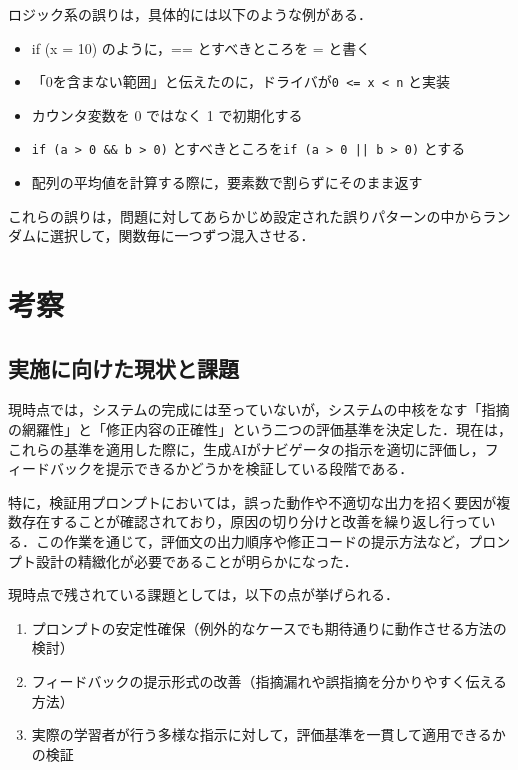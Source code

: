 \documentclass[twoside,twocolumn,10pt]{jsarticle}
\begin{document}
ロジック系の誤りは，具体的には以下のような例がある．

\begin{itemize}
        \item if (x = 10) のように，== とすべきところを = と書く
        \item 「0を含まない範囲」と伝えたのに，ドライバが\texttt{0 <= x < n} と実装
        \item カウンタ変数を 0 ではなく 1 で初期化する
        \item \texttt{if (a > 0 \&\& b > 0)} とすべきところを\texttt{if (a > 0 || b > 0)} とする
        \item 配列の平均値を計算する際に，要素数で割らずにそのまま返す
\end{itemize}

これらの誤りは，問題に対してあらかじめ設定された誤りパターンの中からランダムに選択して，関数毎に一つずつ混入させる．

\section{考察}\label{考察}

\subsection{実施に向けた現状と課題}
現時点では，システムの完成には至っていないが，システムの中核をなす「指摘の網羅性」と「修正内容の正確性」という二つの評価基準を決定した．現在は，これらの基準を適用した際に，生成AIがナビゲータの指示を適切に評価し，フィードバックを提示できるかどうかを検証している段階である．

特に，検証用プロンプトにおいては，誤った動作や不適切な出力を招く要因が複数存在することが確認されており，原因の切り分けと改善を繰り返し行っている．この作業を通じて，評価文の出力順序や修正コードの提示方法など，プロンプト設計の精緻化が必要であることが明らかになった．

現時点で残されている課題としては，以下の点が挙げられる．

\begin{enumerate}
    \item プロンプトの安定性確保（例外的なケースでも期待通りに動作させる方法の検討）
    \item フィードバックの提示形式の改善（指摘漏れや誤指摘を分かりやすく伝える方法）
    \item 実際の学習者が行う多様な指示に対して，評価基準を一貫して適用できるかの検証
\end{enumerate}
\end{document}
